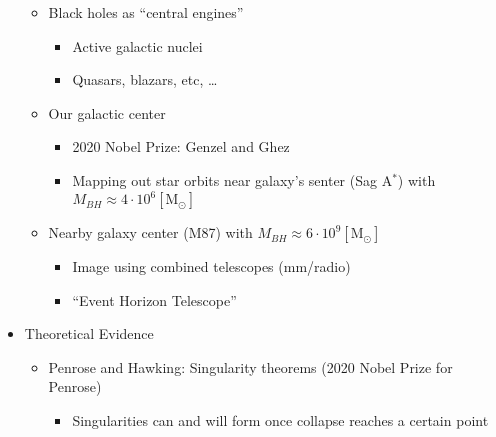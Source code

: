 \begin{itemize}
\begin{itemize}
      \item Black holes as ``central engines''

        \begin{itemize}

          \item Active galactic nuclei

          \item Quasars, blazars, etc, \ldots

        \end{itemize}

      \item Our galactic center

        \begin{itemize}

          \item 2020 Nobel Prize: Genzel and Ghez

          \item Mapping out star orbits near galaxy's senter (Sag A$^*$) with $M_{BH}\approx 4\cdot10^6[\text{M}_{\odot}]$

        \end{itemize}

      \item Nearby galaxy center (M87) with $M_{BH}\approx 6\cdot10^9[\text{M}_{\odot}]$

        \begin{itemize}

          \item Image using combined telescopes (mm/radio)

          \item ``Event Horizon Telescope''

        \end{itemize}

    \end{itemize}

  \item Theoretical Evidence

    \begin{itemize}

      \item Penrose and Hawking: Singularity theorems (2020 Nobel Prize for Penrose)

        \begin{itemize}

          \item Singularities can and will form once collapse reaches a certain point


\end{itemize}
\end{itemize}
\end{itemize}
